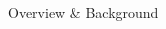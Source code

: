 \documentclass[final,t]{beamer}
\begin{document}
\begin{frame}{}
\begin{columns}[t]
\begin{column}{.33\linewidth}
\begin{block}{Overview \& Background}
\begin{center}
\begin{minipage}{.85\textwidth}
%
%

\end{minipage}
\end{center}
\end{block}
\end{column}
\end{columns}
\end{frame}
\end{document}
